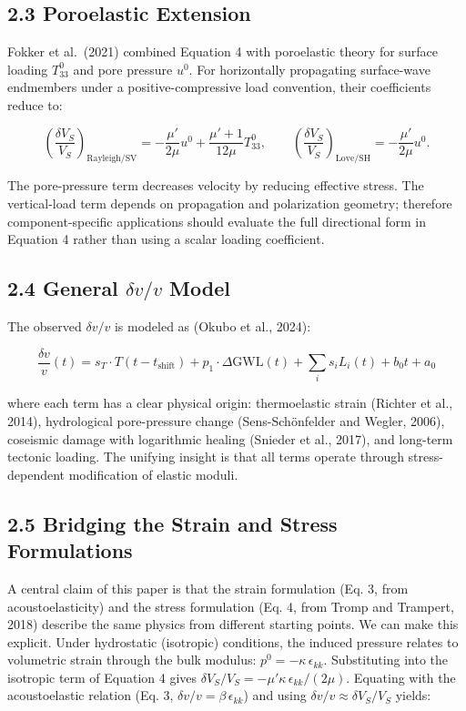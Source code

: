 \documentclass[draft]{agujournal2019}
\begin{document}
\subsection{2.3 Poroelastic Extension}\label{poroelastic-extension}

Fokker et al.~(2021) combined Equation 4 with poroelastic theory for
surface loading \(T_{33}^0\) and pore pressure \(u^0\). For horizontally
propagating surface-wave endmembers under a positive-compressive load
convention, their coefficients reduce to:

\[\left(\frac{\delta V_S}{V_S}\right)_{\mathrm{Rayleigh/SV}} = -\frac{\mu'}{2\mu}u^0 + \frac{\mu' + 1}{12\mu}T_{33}^0,\qquad
\left(\frac{\delta V_S}{V_S}\right)_{\mathrm{Love/SH}} = -\frac{\mu'}{2\mu}u^0 . \tag{5}\]

The pore-pressure term decreases velocity by reducing effective stress.
The vertical-load term depends on propagation and polarization geometry;
therefore component-specific applications should evaluate the full
directional form in Equation 4 rather than using a scalar loading
coefficient.

\subsection{\texorpdfstring{2.4 General \(\delta v/v\)
Model}{2.4 General \textbackslash delta v/v Model}}\label{general-delta-vv-model}

The observed \(\delta v/v\) is modeled as (Okubo et al., 2024):

\[\frac{\delta v}{v}(t) = s_T \cdot T(t - t_{\text{shift}}) + p_1 \cdot \Delta\text{GWL}(t) + \sum_i s_i L_i(t) + b_0 t + a_0 \tag{6}\]

where each term has a clear physical origin: thermoelastic strain
(Richter et al., 2014), hydrological pore-pressure change
(Sens-Schönfelder and Wegler, 2006), coseismic damage with logarithmic
healing (Snieder et al., 2017), and long-term tectonic loading. The
unifying insight is that all terms operate through stress-dependent
modification of elastic moduli.

\subsection{2.5 Bridging the Strain and Stress
Formulations}\label{bridging-the-strain-and-stress-formulations}

A central claim of this paper is that the strain formulation (Eq. 3,
from acoustoelasticity) and the stress formulation (Eq. 4, from Tromp
and Trampert, 2018) describe the same physics from different starting
points. We can make this explicit. Under hydrostatic (isotropic)
conditions, the induced pressure relates to volumetric strain through
the bulk modulus: \(p^0 = -\kappa \, \epsilon_{kk}\). Substituting into
the isotropic term of Equation 4 gives
\(\delta V_S/V_S = -\mu' \kappa \, \epsilon_{kk} / (2\mu)\). Equating
with the acoustoelastic relation (Eq. 3,
\(\delta v/v = \beta \, \epsilon_{kk}\)) and using
\(\delta v/v \approx \delta V_S/V_S\) yields:
\end{document}
